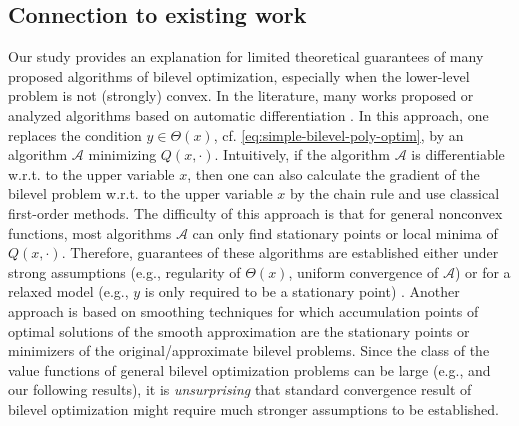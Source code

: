 \documentclass{article}
\newcommand*{\cA}{\mathcal{A}}
\newcommand{\firstvar}{x}
\newcommand{\secondvar}{y}
\theoremstyle{plain}
\theoremstyle{definition}
\begin{document}
\begin{appendices}
\section{Connection to existing work}
\label{appendix:existing-works}
Our study provides an explanation for limited theoretical guarantees of many proposed algorithms of bilevel optimization, especially when the lower-level problem is not (strongly) convex. In the literature, many works proposed or analyzed algorithms based on automatic differentiation \cite{liu2021towards,liu2021valuefunction,arbel:hal-03869097,liu2020generic}. In this approach, one replaces the condition $\secondvar \in \Theta(\firstvar)$, cf. \eqref{eq:simple-bilevel-poly-optim}, by an algorithm $\cA$ minimizing $Q(\firstvar, \cdot)$. Intuitively, if the algorithm $\cA$ is differentiable w.r.t. to the upper variable $\firstvar$, then one can also calculate the gradient of the bilevel problem w.r.t. to the upper variable $\firstvar$ by the chain rule and use classical first-order methods. The difficulty of this approach is that for general nonconvex functions, most algorithms $\cA$ can only find stationary points or local minima of $Q(\firstvar, \cdot)$. Therefore, guarantees of these algorithms are established either under strong assumptions (e.g., regularity of $\Theta(\firstvar)$, uniform convergence of $\cA$) \cite{liu2021towards,liu2020generic} or for a relaxed model (e.g., $\secondvar$ is only required to be a stationary point) \cite{arbel:hal-03869097}. Another approach is based on smoothing techniques \cite{liu2021valuefunction,guihua2014solving} for which accumulation points of optimal solutions of the smooth approximation are the stationary points or minimizers of the original/approximate bilevel problems. Since the class of the value functions of general bilevel optimization problems can be large (e.g.,  and our following results), it is \emph{unsurprising} that standard convergence result of bilevel optimization might require much stronger assumptions to be established.


\end{appendices}
\end{document}
